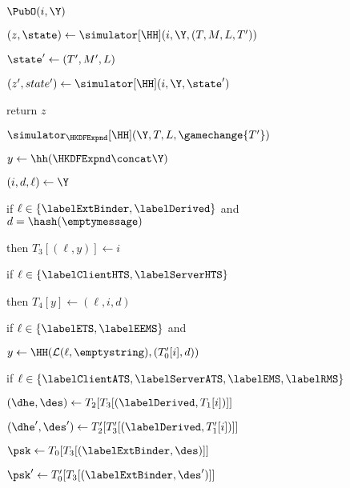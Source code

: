\begin{figure}[tp]
	\begin{minipage}[t]{0.48\textwidth}
		\NewExperiment[Game $\Gm_7$]
		
		\begin{algorithm}{$\PubO(i,\Y)$}
		\item $(z, \state) \gets \simulator[\HH] (i,\Y, (T, M, L, T'))$
		\item $\state' \gets (T', M', L)$
		\item $(z', state') \gets\simulator[\HH](i, \Y, \state')$
		\item return $z$
	\end{algorithm}
\end{minipage}
	\begin{minipage}[t]{0.49\textwidth}
		\ExptSepSpace
		\begin{oracle}{$\simulator_{\HKDFExpnd}[\HH](\Y, T, L, \gamechange{T'})$}
			\item $y \gets \hh(\HKDFExpnd\concat\Y)$
			\item $(i, d, \ell) \gets \Y$
			\item if $\ell \in \{\labelExtBinder, \labelDerived\}$ and $d = \hash(\emptymessage)$
			\item \quad then $T_{3}[(\ell,y)] \gets i$
			\item if $\ell \in \{\labelClientHTS, \labelServerHTS\}$
			\item \quad then $T_{4}[y] \gets (\ell, i, d)$
			\item	
			\item if $\ell \in \{\labelETS, \labelEEMS\}$ and 
			\item \quad $y \gets \HH(\mathcal{L}(\ell,\emptystring),(T'_{0}[i], d))$
			\item \quad {}
			\item \quad \quad {}
			\item
			\item if $\ell \in \{ \labelClientATS, \labelServerATS,\labelEMS, \labelRMS \}$
			\item \quad $(\dhe, \des) \gets T_2[T_3[(\labelDerived, T_1[i])]]$
			\item \quad $(\dhe', \des') \gets T'_2[T'_3[(\labelDerived, T'_1[i])]]$
			\item \quad $\psk \gets T_0[T_3[(\labelExtBinder, \des)]]$
			\item \quad $\psk' \gets T'_0[T_3[(\labelExtBinder, \des')]]$
			\item \quad {}

\end{oracle}
\end{minipage}
\end{figure}
